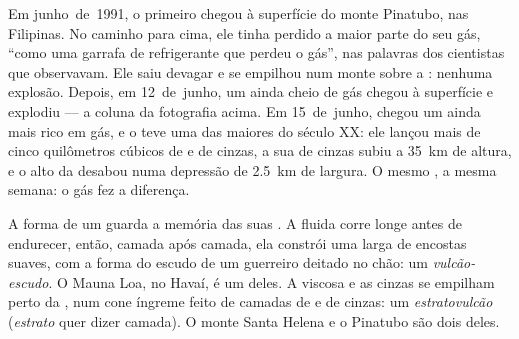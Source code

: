 \begin{example}\label{ex:g7:volcanoes:pinatubo}
Em junho~de~1991, o primeiro  chegou à superfície do monte Pinatubo,
nas Filipinas. No caminho para cima, ele tinha perdido a maior parte do seu
gás, ``como uma garrafa de refrigerante que perdeu o gás'', nas palavras
dos cientistas que observavam. Ele saiu devagar e se empilhou num monte
sobre a : nenhuma explosão. Depois, em 12~de~junho, um  ainda
cheio de gás chegou à superfície e explodiu --- a coluna da fotografia
acima. Em 15~de~junho, chegou um  ainda mais rico em gás, e o 
teve uma das maiores  do século XX: ele lançou mais de cinco
quilômetros cúbicos de  e de cinzas, a sua  de cinzas subiu a
\qty{35}{km} de altura, e o alto da  desabou numa depressão de
\qty{2.5}{km} de largura. O mesmo , a mesma semana: o gás fez a
diferença.
\end{example}

A forma de um  guarda a memória das suas . A  fluida
corre longe antes de endurecer, então, camada após camada, ela constrói
uma  larga de encostas suaves, com a forma do escudo de um
guerreiro deitado no chão: um \emph{vulcão-escudo}. O Mauna Loa, no Havaí,
é um deles. A  viscosa e as cinzas se empilham perto da , num cone
íngreme feito de camadas de  e de cinzas: um \emph{estratovulcão}
(\emph{estrato} quer dizer camada). O monte Santa Helena e o Pinatubo são
dois deles.

